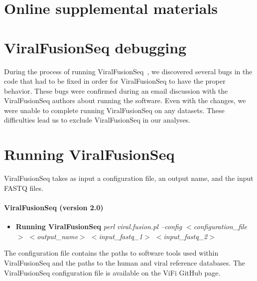 \documentclass[12pt]{article}
\begin{document}
\section*{Online supplemental materials}
\setcounter{figure}{0}
\renewcommand{\thesection}{S\arabic{section}}   
\renewcommand{\thefigure}{S\arabic{figure}}   
\renewcommand{\thetable}{S\arabic{table}}   
\section{ViralFusionSeq debugging}\label{vfs_error}
During the process of running ViralFusionSeq~\cite{Li2013}, we discovered several bugs in the code that had
to be fixed in order for ViralFusionSeq to have the proper behavior.  These bugs were confirmed
during an email discussion with the ViralFusionSeq authors about running the software.  Even
with the changes, we were unable to complete running ViralFusionSeq on any datasets.  These difficulties lead us to exclude ViralFusionSeq in our analyses.

\section{Running ViralFusionSeq}\label{vfs_commands}
ViralFusionSeq takes as input a configuration file, an output name, and the input FASTQ files.  

\paragraph{\textbf{ViralFusionSeq (version 2.0)}}
\begin{itemize}
\item{\textbf{Running ViralFusionSeq}} \emph{perl viral.fusion.pl --config $<$configuration\_file$>$ $<$output\_name$>$ $<$input\_fastq\_1$>$ $<$input\_fastq\_2$>$}
\end{itemize}

The configuration file contains the paths to software tools used within ViralFusionSeq and the paths to the human and viral reference databases.  The ViralFusionSeq configuration file is available on the ViFi GitHub page.
\end{document}
